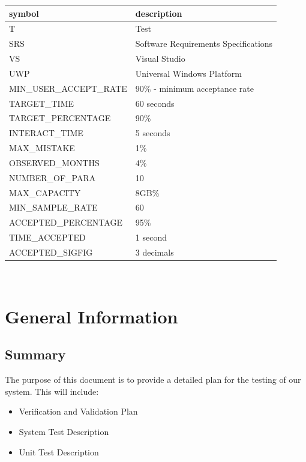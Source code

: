 \documentclass[12pt, titlepage]{article}
\begin{document}
\renewcommand{\arraystretch}{1.2}
\begin{tabular}{l l} 
  \toprule		
  \textbf{symbol} & \textbf{description}\\
  \midrule 
  T & Test\\
  SRS & Software Requirements Specifications \\
  VS & Visual Studio\\
  UWP & Universal Windows Platform\\
  MIN\_USER\_ACCEPT\_RATE & 90\% - minimum acceptance rate\\
  TARGET\_TIME & 60 seconds \\
  TARGET\_PERCENTAGE & 90\% \\
  INTERACT\_TIME & 5 seconds \\
  MAX\_MISTAKE & 1\% \\
  OBSERVED\_MONTHS & 4\% \\
  NUMBER\_OF\_PARA & 10 \\ 
  MAX\_CAPACITY & 8GB\% \\ 
  MIN\_SAMPLE\_RATE & 60 \\
  ACCEPTED\_PERCENTAGE & 95\% \\
  TIME\_ACCEPTED & 1 second \\
  ACCEPTED\_SIGFIG & 3 decimals \\
  \bottomrule
\end{tabular}\\


\newpage


\section{General Information}

\subsection{Summary}

The purpose of this document is to provide a detailed plan for the testing of our system. This will include:
\begin{itemize}
  \item Verification and Validation Plan
  \item System Test Description
  \item Unit Test Description
\end{itemize}
\end{document}
